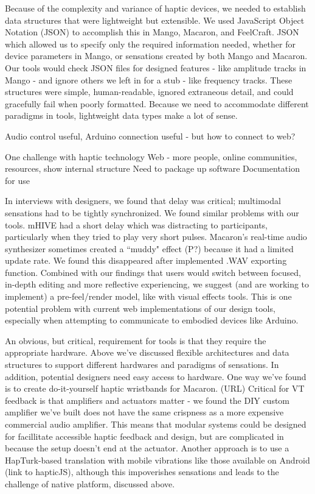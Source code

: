 Because of the complexity and variance of haptic devices, we needed to establish data structures that were lightweight but extensible.
We used JavaScript Object Notation (JSON) to accomplish this in Mango, Macaron, and FeelCraft.
JSON which allowed us to specify only the required information needed, whether for device parameters in Mango, or sensations created by both Mango and Macaron.
Our tools would check JSON files for designed features - like amplitude tracks in Mango - and ignore others we left in for a stub - like frequency tracks.
These structures were simple, human-readable, ignored extraneous detail, and could gracefully fail when poorly formatted.
Because we need to accommodate different paradigms in \haxd tools, lightweight data types make a lot of sense.

Audio control useful, Arduino connection useful - but how to connect to web?


One challenge with haptic technology 
Web - more people, online communities, resources, show internal structure
Need to package up software
Documentation for use

In interviews with designers, we found that delay was critical; multimodal sensations had to be tightly synchronized.
We found similar problems with our tools.
mHIVE had a short delay which was distracting to participants, particularly when they tried to play very short pulses.
Macaron's real-time audio synthesizer sometimes created a ``muddy" effect (P?) because it had a limited update rate.
We found this disappeared after implemented .WAV exporting function.
Combined with our findings that users would switch between focused, in-depth editing and more reflective experiencing, we suggest (and are working to implement) a pre-feel/render model, like with visual effects tools.
This is one potential problem with current web implementations of our design tools, especially when attempting to communicate to embodied devices like Arduino.


An obvious, but critical, requirement for \haxd tools is that they require the appropriate hardware.
Above we've discussed flexible architectures and data structures to support different hardwares and paradigms of sensations.
In addition, potential designers need easy access to hardware.
One way we've found is to create do-it-yourself haptic wristbands for Macaron. (URL)
Critical for VT feedback is that amplifiers and actuators matter - we found the DIY custom amplifier we've built does not have the same crispness as a more expensive commercial audio amplifier.
This means that modular systems could be designed for facillitate accessible haptic feedback and design, but are complicated in because the setup doesn't end at the actuator.
Another approach is to use a HapTurk-based translation with mobile vibrations like those available on Android (link to hapticJS), although this impoverishes sensations and leads to the challenge of native platform, discussed above.


